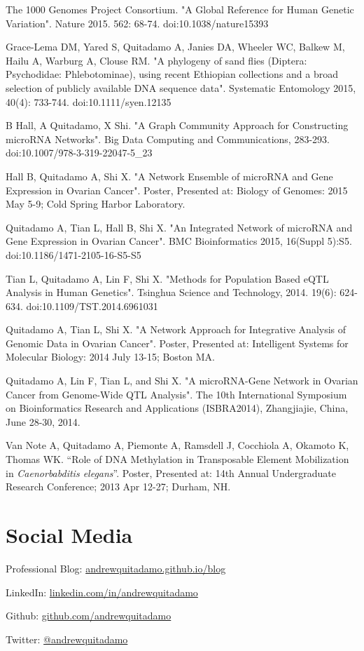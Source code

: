 \documentclass[margin,line]{res}
\begin{document}
\begin{resume}
The 1000 Genomes Project Consortium. "A Global Reference for Human Genetic Variation". Nature 2015. 562: 68-74. doi:10.1038/nature15393

Grace-Lema DM, Yared S, Quitadamo A, Janies DA, Wheeler WC, Balkew M, Hailu A, Warburg A, Clouse RM. "A phylogeny of sand flies (Diptera: Psychodidae: Phlebotominae), using recent Ethiopian collections and a broad selection of publicly available DNA sequence data". Systematic Entomology 2015, 40(4): 733-744. doi:10.1111/syen.12135

B Hall, A Quitadamo, X Shi. "A Graph Community Approach for Constructing microRNA Networks". Big Data Computing and Communications, 283-293. doi:10.1007/978-3-319-22047-5\_23


Hall B, Quitadamo A, Shi X. "A Network Ensemble of microRNA and Gene Expression in Ovarian Cancer". Poster, Presented at: Biology of Genomes: 2015 May 5-9; Cold Spring Harbor Laboratory. 

Quitadamo A, Tian L, Hall B, Shi X. "An Integrated Network of microRNA and Gene Expression in Ovarian Cancer". BMC Bioinformatics 2015, 16(Suppl 5):S5. doi:10.1186/1471-2105-16-S5-S5

Tian L, Quitadamo A, Lin F, Shi X. "Methods for Population Based eQTL Analysis in Human Genetics". Tsinghua Science and Technology, 2014. 19(6): 624-634. doi:10.1109/TST.2014.6961031

Quitadamo A, Tian L, Shi X. "A Network Approach for Integrative Analysis of Genomic Data in Ovarian Cancer". Poster, Presented at: Intelligent Systems for Molecular Biology: 2014 July 13-15; Boston MA.

Quitadamo A, Lin F, Tian L, and Shi X. "A microRNA-Gene Network in Ovarian Cancer from Genome-Wide QTL Analysis". The 10th International Symposium on Bioinformatics Research and Applications (ISBRA2014), Zhangjiajie, China, June 28-30, 2014.

Van Note A, Quitadamo A, Piemonte A, Ramsdell J, Cocchiola A, Okamoto K, Thomas WK. “Role of DNA Methylation in Transposable Element Mobilization in {\em Caenorbabditis elegans}”. Poster, Presented at: 14th Annual Undergraduate Research Conference; 2013 Apr 12-27; Durham, NH.

\section{\sc Social Media}

Professional Blog: \href{https://andrewquitadamo.github.io/blog}{andrewquitadamo.github.io/blog}

LinkedIn: \href{http://linkedin.com/in/andrewquitadamo}{linkedin.com/in/andrewquitadamo}

Github: \href{https://github.com/andrewquitadamo}{github.com/andrewquitadamo}

Twitter: \href{https://twitter.com/andrewquitadamo}{@andrewquitadamo}

\end{resume}
\end{document}
